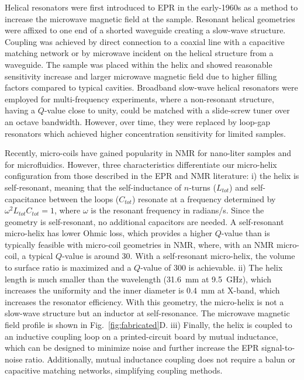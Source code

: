 Helical resonators were first introduced to EPR in the early-1960s as a method to increase the microwave magnetic field at the sample. Resonant helical geometries were affixed to one end of a shorted waveguide creating a slow-wave structure. \cite{Webb1962, Helix1967} Coupling was achieved by direct connection to a coaxial line with a capacitive matching network or by microwave incident on the helical structure from a waveguide. The sample was placed within the helix and showed reasonable sensitivity increase and larger microwave magnetic field due to higher filling factors compared to typical cavities. \cite{Nolle1966} Broadband slow-wave helical resonators were employed for multi-frequency experiments, where a non-resonant structure, having a $Q$-value close to unity, could be matched with a slide-screw tuner over an octave bandwidth. \cite{nonresonant1986} However, over time, they were replaced by loop-gap resonators which achieved higher concentration sensitivity for limited samples.\cite{froncisz1982loop}

Recently, micro-coils have gained popularity in NMR for nano-liter samples \cite{Olson1967, SUBRAMANIAN1998227, cr980140f,Kentgens2008,Raluca2011,Jones2012} and for microfluidics. \cite{Mompean2018} However, three characteristics differentiate our micro-helix configuration from those described in the EPR \cite{Webb1962, Helix1967, oldmicro} and NMR literature\cite{WEBB2005892}: i) the helix is self-resonant, meaning that the self-inductance of $n$-turns ($L_{tot}$) and self-capacitance between the loops ($C_{tot}$) resonate at a frequency determined by $\omega^2 L_{tot}C_{tot}=1$, where $\omega$ is the resonant frequency in radians/s. Since the geometry is self-resonant, no additional capacitors are needed. A self-resonant micro-helix has lower Ohmic loss, which provides a higher $Q$-value than is typically feasible with micro-coil geometries in NMR, where, with an NMR micro-coil, a typical $Q$-value is around 30. \cite{WEBB2005892} With a self-resonant micro-helix, the volume to surface ratio is maximized and a $Q$-value of 300 is achievable. ii) The helix length is much smaller than the wavelength (31.6~mm at 9.5~GHz), which increases the uniformity and the inner diameter is 0.4~mm at X-band, which increases the resonator efficiency. With this geometry, the micro-helix is not a slow-wave structure but an inductor at self-resonance. The microwave magnetic field profile is shown in Fig.~\ref{fig:fabricated}D. iii) Finally, the helix is coupled to an inductive coupling loop on a printed-circuit board by mutual inductance, which can be designed to minimize noise and further increase the EPR signal-to-noise ratio. \cite{coupling2016} Additionally, mutual inductance coupling does not require a balun or capacitive matching networks, simplifying coupling methods.

